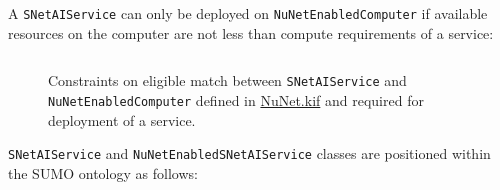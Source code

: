 \documentclass[]{report}
\begin{document}
A \texttt{SNetAIService} can only be deployed on \texttt{NuNetEnabledComputer}
if available resources on the computer are not less than compute requirements of
a service:

\begin{figure}[H]
  \centering
  \inputminted[firstline=38, lastline=47, linenos,tabsize=2,breaklines,
  fontsize=\small]{scm}{../../../ontology/NuNet.kif}
  \captionsetup{width=1\linewidth}
  \vspace{-0.3cm}
  \caption{Constraints on eligible match between \texttt{SNetAIService} and
  \texttt{NuNetEnabledComputer} defined in
  \href{https://github.com/singnet/ai-dsl/blob/master/ontology/NuNet.kif}{NuNet.kif}
  and required for deployment of a service.}
  \label{fig:service_deployment_requirements}
\end{figure}

\texttt{SNetAIService} and \texttt{NuNetEnabledSNetAIService} classes are positioned within the SUMO ontology as follows:
\end{document}

